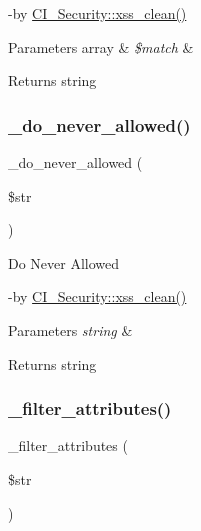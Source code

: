 -\/by \mbox{\hyperlink{class_c_i___security_acb759426dbab128d3d8164805225381c}{C\+I\+\_\+\+Security\+::xss\+\_\+clean()}} 
\begin{DoxyParams}[1]{Parameters}
array & {\em \$match} & \\
\hline
\end{DoxyParams}
\begin{DoxyReturn}{Returns}
string 
\end{DoxyReturn}
\mbox{\label{class_c_i___security_a61217e43f888cdf8afb1fba16b5cd9f6}} 
\subsubsection{\texorpdfstring{\+\_\+do\+\_\+never\+\_\+allowed()}{\_do\_never\_allowed()}}
{\footnotesize\ttfamily \+\_\+do\+\_\+never\+\_\+allowed (\begin{DoxyParamCaption}\item[{}]{\$str }\end{DoxyParamCaption})\hspace{0.3cm}{\ttfamily [protected]}}

Do Never Allowed

-\/by \mbox{\hyperlink{class_c_i___security_acb759426dbab128d3d8164805225381c}{C\+I\+\_\+\+Security\+::xss\+\_\+clean()}} 
\begin{DoxyParams}{Parameters}
{\em string} & \\
\hline
\end{DoxyParams}
\begin{DoxyReturn}{Returns}
string 
\end{DoxyReturn}
\mbox{\label{class_c_i___security_aa385a9c7527f5eece656b9cac73979d3}} 
\subsubsection{\texorpdfstring{\+\_\+filter\+\_\+attributes()}{\_filter\_attributes()}}
{\footnotesize\ttfamily \+\_\+filter\+\_\+attributes (\begin{DoxyParamCaption}\item[{}]{\$str }\end{DoxyParamCaption})\hspace{0.3cm}{\ttfamily [protected]}}

